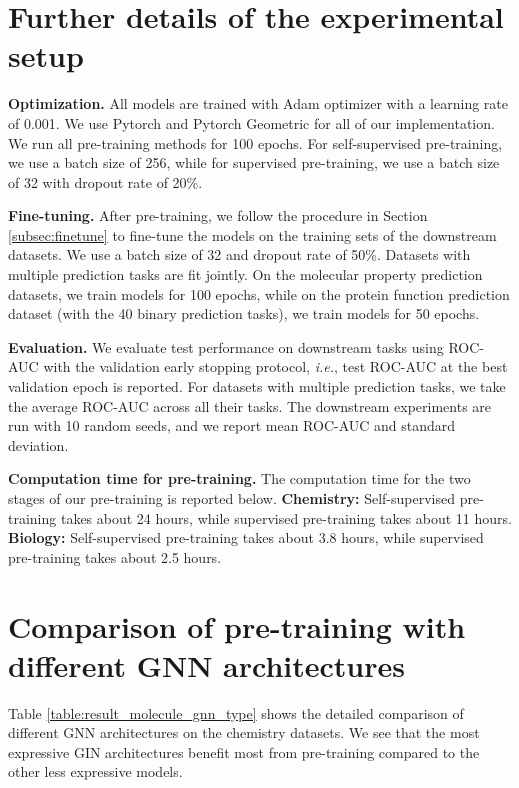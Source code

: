\documentclass{article} \usepackage{iclr2020_conference,times}
\numberwithin{equation}{section}
\theoremstyle{plain}
\theoremstyle{definition}
\theoremstyle{remark}
\newcommand{\ie}{\textit{i.e.}}
\begin{document}
\section{Further details of the experimental setup}
\label{app:furthre_setup}
{\bf Optimization.}
All models are trained with Adam optimizer \citep{kingma2014adam} with a learning rate of 0.001. We use Pytorch \citep{paszke2017automatic} and Pytorch Geometric \citep{fey2019fast} for all of our implementation. We run all pre-training methods for 100 epochs.
For self-supervised pre-training, we use a batch size of 256, while for supervised pre-training, we use a batch size of 32 with dropout rate of 20\%. 

{\bf Fine-tuning.}
After pre-training, we follow the procedure in Section \ref{subsec:finetune} to fine-tune the models on the training sets of the downstream datasets. We use a batch size of 32 and dropout rate of 50\%. Datasets with multiple prediction tasks are fit jointly. On the molecular property prediction datasets, we train models for 100 epochs, while on the protein function prediction dataset (with the 40 binary prediction tasks), we train models for 50 epochs. 

{\bf Evaluation.} We evaluate test performance on downstream tasks using ROC-AUC \citep{bradley1997use} with the validation early stopping protocol, \ie, test ROC-AUC at the best validation epoch is reported. For datasets with multiple prediction tasks, we take the average ROC-AUC across all their tasks. The downstream experiments are run with 10 random seeds, and we report mean ROC-AUC and standard deviation. 

{\bf Computation time for pre-training.}
The computation time for the two stages of our pre-training is reported below.
{\bf Chemistry:} Self-supervised pre-training takes about 24 hours, while supervised pre-training takes about 11 hours.
{\bf Biology:} Self-supervised pre-training takes about 3.8 hours, while supervised pre-training takes about 2.5 hours.

\section{Comparison of pre-training with different GNN architectures}
\label{app:gnn_type_comp}
Table \ref{table:result_molecule_gnn_type} shows the detailed comparison of different GNN architectures on the chemistry datasets.
We see that the most expressive GIN architectures benefit most from pre-training compared to the other less expressive models.
\end{document}
